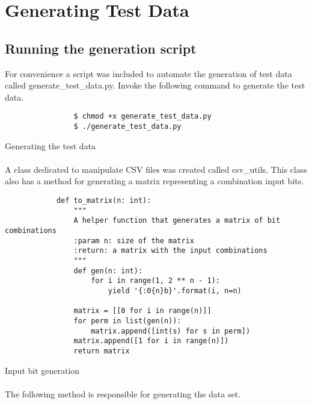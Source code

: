 \documentclass[11pt, a4paper]{article}
\begin{document}
    \section{Generating Test Data}
        \subsection{Running the generation script}
        For convenience a script was included to automate the generation of test data called generate\_test\_data.py. Invoke the following command to generate the test data.
        \begin{listing}[H]
            \begin{verbatim}
                $ chmod +x generate_test_data.py
                $ ./generate_test_data.py
            \end{verbatim}
            \caption{Generating the test data}
        \end{listing}
    \paragraph{} A class dedicated to manipulate CSV files was created called csv\_utils. This class also has a method for generating a matrix representing a combination input bits.

    \begin{listing}[H]
        \begin{verbatim}
            def to_matrix(n: int):
                """
                A helper function that generates a matrix of bit combinations
                :param n: size of the matrix
                :return: a matrix with the input combinations
                """
                def gen(n: int):
                    for i in range(1, 2 ** n - 1):
                        yield '{:0{n}b}'.format(i, n=n)

                matrix = [[0 for i in range(n)]]
                for perm in list(gen(n)):
                    matrix.append([int(s) for s in perm])
                matrix.append([1 for i in range(n)])
                return matrix
        \end{verbatim}
        \caption{Input bit generation}
    \end{listing}
    
    \paragraph{} The following method is responsible for generating the data set.
\end{document}
